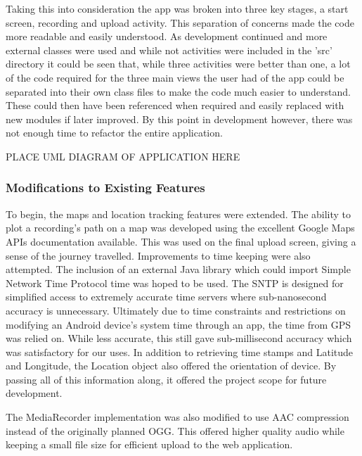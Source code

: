 \documentclass{l3proj}
\begin{document}
Taking this into consideration the app was broken into three key stages, a start screen, recording and upload activity. This separation of concerns made the code more readable and easily understood. As development continued and more external classes were used and while not activities were included in the 'src' directory it could be seen that, while three activities were better than one, a lot of the code required for the three main views the user had of the app could be separated into their own class files to make the code much easier to understand. These could then have been referenced when required and easily replaced with new modules if later improved. By this point in development however, there was not enough time to refactor the entire application.

PLACE UML DIAGRAM OF APPLICATION HERE

\subsubsection{Modifications to Existing Features}
To begin, the maps and location tracking features were extended. The ability to plot a recording's path on a map was developed using the excellent Google Maps APIs documentation available. This was used on the final upload screen, giving a sense of the journey travelled. Improvements to time keeping were also attempted. The inclusion of an external Java library which could import Simple Network Time Protocol time was hoped to be used. The SNTP is designed for simplified access to extremely accurate time servers where sub-nanosecond accuracy is unnecessary. Ultimately due to time constraints and restrictions on modifying an Android device's system time through an app, the time from GPS was relied on. While less accurate, this still gave sub-millisecond accuracy which was satisfactory for our uses. In addition to retrieving time stamps and Latitude and Longitude, the Location object also offered the orientation of device. By passing all of this information along, it offered the project scope for future development.

The MediaRecorder implementation was also modified to use AAC compression instead of the originally planned OGG. This offered higher quality audio while keeping a small file size for efficient upload to the web application.
\end{document}
